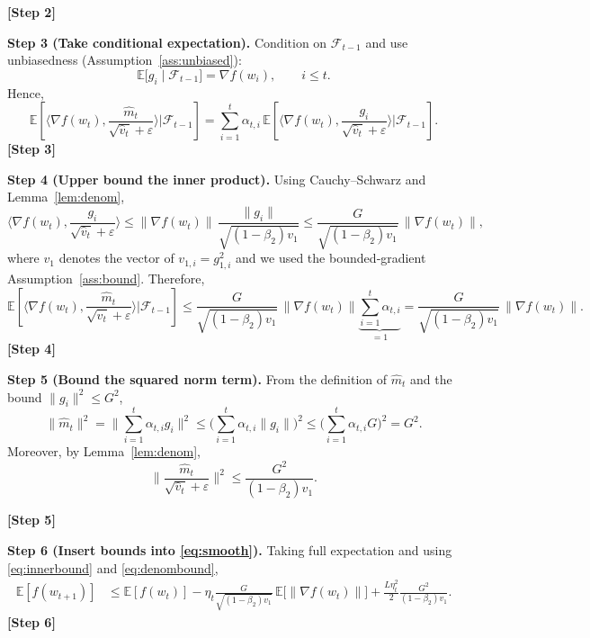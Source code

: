 \documentclass{article}
\begin{document}
\textbf{[Step 2]}

\noindent\textbf{Step 3 (Take conditional expectation).}  
Condition on $\mathcal{F}_{t-1}$ and use unbiasedness (Assumption~\ref{ass:unbiased}):
\[
\mathbb{E}\big[g_i\mid\mathcal{F}_{t-1}\big]=\nabla f(w_i),\qquad i\le t .
\]
Hence,
\[
\mathbb{E}\!\left[\Big\langle\nabla f(w_t),\frac{\hat m_t}{\sqrt{\hat v_t}+\varepsilon}\Big\rangle\Big|\mathcal{F}_{t-1}\right]
 = \sum_{i=1}^{t}\alpha_{t,i}\,
   \mathbb{E}\!\left[\Big\langle\nabla f(w_t),\frac{g_i}{\sqrt{\hat v_t}+\varepsilon}\Big\rangle\Big|\mathcal{F}_{t-1}\right].
\tag{3}\label{eq:expinner}
\]
\textbf{[Step 3]}

\noindent\textbf{Step 4 (Upper bound the inner product).}  
Using Cauchy–Schwarz and Lemma~\ref{lem:denom},
\[
\Big\langle\nabla f(w_t),\frac{g_i}{\sqrt{\hat v_t}+\varepsilon}\Big\rangle
\le \|\nabla f(w_t)\|\,\frac{\|g_i\|}{\sqrt{(1-\beta_2)v_{1}}}
\le \frac{G}{\sqrt{(1-\beta_2)v_{1}}}\,\|\nabla f(w_t)\| ,
\]
where $v_{1}$ denotes the vector of $v_{1,i}=g_{1,i}^2$ and we used the bounded‑gradient Assumption~\ref{ass:bound}. Therefore,
\[
\mathbb{E}\!\left[\Big\langle\nabla f(w_t),\frac{\hat m_t}{\sqrt{\hat v_t}+\varepsilon}\Big\rangle\Big|\mathcal{F}_{t-1}\right]
\le \frac{G}{\sqrt{(1-\beta_2)v_{1}}}\,\|\nabla f(w_t)\|
\underbrace{\sum_{i=1}^{t}\alpha_{t,i}}_{=1}
= \frac{G}{\sqrt{(1-\beta_2)v_{1}}}\,\|\nabla f(w_t)\|.
\tag{4}\label{eq:innerbound}
\]
\textbf{[Step 4]}

\noindent\textbf{Step 5 (Bound the squared norm term).}  
From the definition of $\hat m_t$ and the bound $\|g_i\|^2\le G^2$,
\[
\|\hat m_t\|^2 = \Big\|\sum_{i=1}^{t}\alpha_{t,i} g_i\Big\|^2
\le \Big(\sum_{i=1}^{t}\alpha_{t,i}\|g_i\|\Big)^2
\le \Big(\sum_{i=1}^{t}\alpha_{t,i} G\Big)^2 = G^2 .
\tag{5}\label{eq:squaredbound}
\]
Moreover, by Lemma~\ref{lem:denom},
\[
\Big\|\frac{\hat m_t}{\sqrt{\hat v_t}+\varepsilon}\Big\|^2
\le \frac{G^2}{(1-\beta_2)v_{1}} .
\tag{6}\label{eq:denombound}
\]

\textbf{[Step 5]}

\noindent\textbf{Step 6 (Insert bounds into \eqref{eq:smooth}).}  
Taking full expectation and using \eqref{eq:innerbound} and \eqref{eq:denombound},
\begin{align}
\mathbb{E}[f(w_{t+1})]
&\le \mathbb{E}[f(w_t)]
   -\eta_t\frac{G}{\sqrt{(1-\beta_2)v_{1}}}\,
     \mathbb{E}\!\big[\|\nabla f(w_t)\|\big]
   +\frac{L\eta_t^2}{2}\frac{G^2}{(1-\beta_2)v_{1}} .
\tag{7}\label{eq:recursion}
\end{align}
\textbf{[Step 6]}
\end{document}
